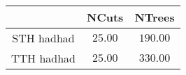 \centering
\begin{tabular}{|c|c|c|} \hline
 & NCuts & NTrees\\\hline
STH 	hadhad & $25.00$ & $190.00$\\\hline
TTH 	hadhad & $25.00$ & $330.00$\\\hline
\end{tabular}
